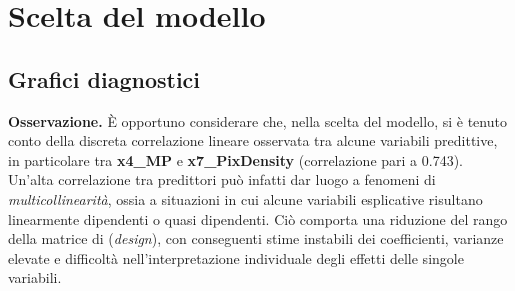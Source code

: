 \section{Scelta del modello}
\subsection{Grafici diagnostici}
\textbf{Osservazione.} È opportuno considerare che, nella scelta del modello, si è tenuto conto della discreta correlazione lineare osservata tra alcune variabili predittive, in particolare tra \textbf{x4\_MP} e \textbf{x7\_PixDensity} (correlazione pari a 0.743). \\ 
   Un’alta correlazione tra predittori può infatti dar luogo a fenomeni di \emph{multicollinearità}, ossia a situazioni in cui alcune variabili esplicative risultano linearmente dipendenti o quasi dipendenti. Ciò comporta una riduzione del rango della matrice di (\emph{design}), con conseguenti stime instabili dei coefficienti, varianze elevate e difficoltà nell’interpretazione individuale degli effetti delle singole variabili.
   
